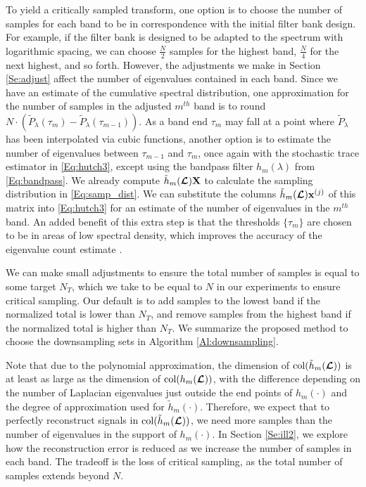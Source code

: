 \documentclass[journal, 10pt]{IEEEtran}
\begin{document}
To yield a critically sampled transform, one option is to choose the number of samples for each band to be in correspondence with the initial filter bank design. For example, if the filter bank is designed to be adapted to the spectrum with logarithmic spacing, we can choose $\frac{N}{2}$ samples for the highest band, $\frac{N}{4}$ for the next highest, and so forth. However, the adjustments we make in Section \ref{Se:adjust} affect the number of eigenvalues contained in each band. Since we have an estimate of the cumulative spectral distribution, one approximation for the number of samples in the adjusted $m^{th}$ band is to round $N \cdot (\tilde{P}_{\lambda}(\tau_{m})-\tilde{P}_{\lambda}(\tau_{m-1}))$. As a band end $\tau_m$ may fall at a point where $\tilde{P}_\lambda$ has been interpolated via cubic functions, another option is to estimate the number of eigenvalues between $\tau_{m-1}$ and $\tau_m$, once again with the stochastic trace estimator in \eqref{Eq:hutch3}, except using the bandpass filter $h_m(\lambda)$ from \eqref{Eq:bandpass}. We already compute $\tilde{h}_m(\boldsymbol{\mathcal{L}}){\bf X}$ to calculate the sampling distribution in \eqref{Eq:samp_dist}. We can substitute the columns $\tilde{h}_m(\boldsymbol{\mathcal{L}}){\bf x}^{(j)}$ of this matrix into 
\eqref{Eq:hutch3} for an estimate of the number of eigenvalues in the $m^{th}$ band. An added benefit of this extra step is that the thresholds $\{\tau_m\}$ are chosen to be in areas of low spectral density, which improves the accuracy of the eigenvalue count estimate \cite{di2016efficient}. 

We can make small adjustments to ensure the total number of samples is equal to some target $N_T$, which we take to be equal to $N$ in our experiments to ensure critical sampling. Our default is to add samples to the lowest band if the normalized total is lower than $N_T$, and remove samples from the highest band if the normalized total is higher than $N_T$. We summarize the proposed method to choose the downsampling sets in Algorithm \ref{Al:downsampling}.

Note that due to the polynomial approximation, the dimension of $\hbox{col}(\tilde{h}_m(\boldsymbol{\mathcal{L}}))$ is at least as large as the dimension of $\hbox{col}({h}_m(\boldsymbol{\mathcal{L}}))$, with the difference depending on the number of Laplacian eigenvalues just outside the end points of $h_m(\cdot)$ and the degree of approximation used for $\tilde{h}_m(\cdot)$. Therefore, we expect that to perfectly reconstruct signals in $\hbox{col}(\tilde{h}_m(\boldsymbol{\mathcal{L}}))$, we need more samples than the number of eigenvalues in the support of $h_m(\cdot)$. In Section \ref{Se:ill2}, we explore how the reconstruction error is reduced as we increase the number of samples in each band. The tradeoff is the loss of critical sampling, as the total number of samples extends beyond $N$. 
\end{document}
